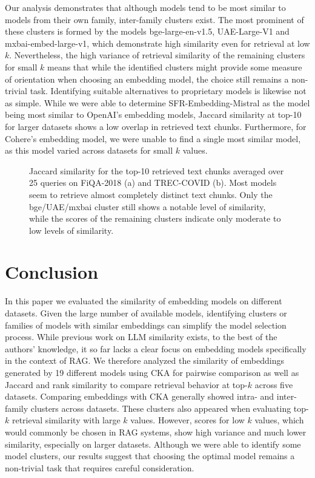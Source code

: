 \documentclass[nonacm,sigconf]{acmart}
\begin{document}
Our analysis demonstrates that although models tend to be most similar to models from their own family, inter-family clusters exist. The most prominent of these clusters is formed by the models bge-large-en-v1.5, UAE-Large-V1 and mxbai-embed-large-v1, which demonstrate high similarity even for retrieval at low $k$. Nevertheless, the high variance of retrieval similarity of the remaining clusters for small $k$ means that while the identified clusters might provide some measure of orientation when choosing an embedding model, the choice still remains a non-trivial task. Identifying suitable alternatives to proprietary models is likewise not as simple. While we were able to determine SFR-Embedding-Mistral as the model being most similar to OpenAI's embedding models, Jaccard similarity at top-10 for larger datasets shows a low overlap in retrieved text chunks. Furthermore, for Cohere's embedding model, we were unable to find a single most similar model, as this model varied across datasets for small $k$ values.

\begin{figure*}
    \centering
    \caption{Jaccard similarity for the top-10 retrieved text chunks averaged over 25 queries on FiQA-2018 (a) and TREC-COVID (b). Most models seem to retrieve almost completely distinct text chunks. Only the bge/UAE/mxbai cluster still shows a notable level of similarity, while the scores of the remaining clusters indicate only moderate to low levels of similarity.}
    \label{fig:fiq_cov_10}
\end{figure*}

\section{Conclusion}

In this paper we evaluated the similarity of embedding models on different datasets. Given the large number of available models, identifying clusters or families of models with similar embeddings can simplify the model selection process. While previous work on LLM similarity exists, to the best of the authors' knowledge, it so far lacks a clear focus on embedding models specifically in the context of RAG. We therefore analyzed the similarity of embeddings generated by 19 different models using CKA for pairwise comparison as well as Jaccard and rank similarity to compare retrieval behavior at top-$k$ across five datasets. Comparing embeddings with CKA generally showed intra- and inter-family clusters across datasets. These clusters also appeared when evaluating top-$k$ retrieval similarity with large $k$ values. However, scores for low $k$ values, which would commonly be chosen in RAG systems, show high variance and much lower similarity, especially on larger datasets. Although we were able to identify some model clusters, our results suggest that choosing the optimal model remains a non-trivial task that requires careful consideration.
\end{document}
